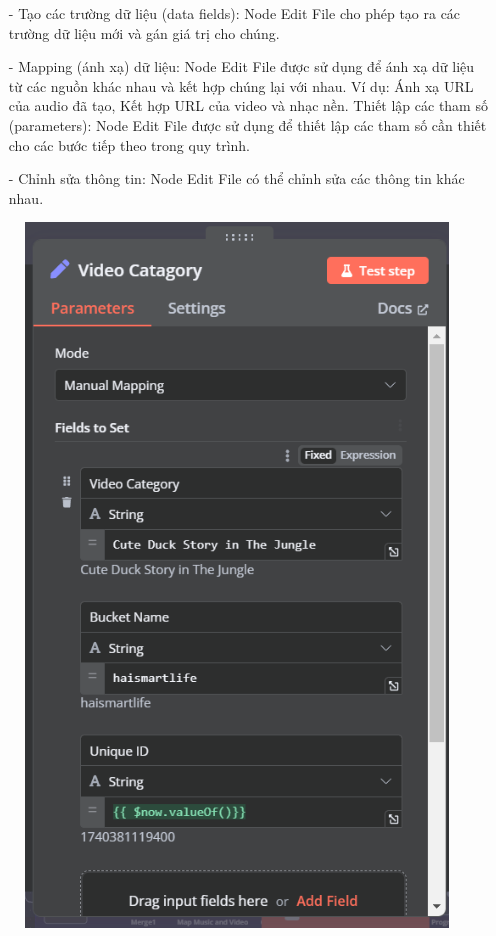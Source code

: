 \begin{itemize}
    \item[-] Tạo các trường dữ liệu (data fields): Node Edit File cho phép tạo ra các trường dữ liệu mới và gán giá trị cho chúng.
    \item[-] Mapping (ánh xạ) dữ liệu: Node Edit File được sử dụng để ánh xạ dữ liệu từ các nguồn khác nhau và kết hợp chúng lại với nhau. Ví dụ: Ánh xạ URL của audio đã tạo, Kết hợp URL của video và nhạc nền. Thiết lập các tham số (parameters): Node Edit File được sử dụng để thiết lập các tham số cần thiết cho các bước tiếp theo trong quy trình.
    \item[-] Chỉnh sửa thông tin: Node Edit File có thể chỉnh sửa các thông tin khác nhau.
\end{itemize}  
    \begin{figure}[H]
 
    \centering
    \begin{minipage}{0.5\textwidth}
        \includegraphics[width=\linewidth]{images/Da1-03.png}
    \end{minipage}
    \hspace{5pt}
    \begin{minipage}{0.4\textwidth}
    

\end{minipage}
\end{figure}
